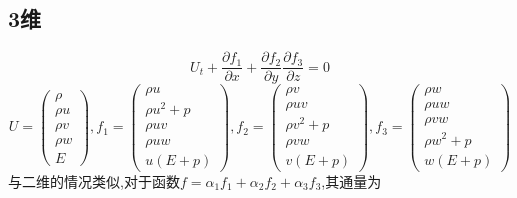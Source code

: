 \documentclass[UTF8]{ctexart}
\begin{document}
  \subsection{3维}
\begin{equation*}
     U_t+\frac{\partial f_1}{\partial x} + \frac{\partial f_2}{\partial y} \frac{\partial f_3}{\partial z}=0
     \end{equation*}
     \begin{equation*}
     U=\left( \begin{matrix}
                \rho \\
                \rho u \\
                \rho v \\
                \rho w \\
                E
              \end{matrix}\right) ,  f_1=\left( \begin{matrix}
                \rho u \\
                \rho u^2+p \\
                \rho uv \\
                \rho uw \\
                u(E+p)
              \end{matrix}\right), f_2=\left( \begin{matrix}
                \rho v \\
                \rho uv \\
                \rho v^2+p \\
                \rho vw \\
                v(E+p)
              \end{matrix}\right) , f_3=\left( \begin{matrix}
                \rho w \\
                \rho uw \\
                \rho vw \\
                \rho w^2+p \\
                w(E+p)
              \end{matrix}\right)
\end{equation*}
  与二维的情况类似,对于函数$f=\alpha_1f_1+\alpha_2f_2+\alpha_3f_3$,其通量为
\end{document}

